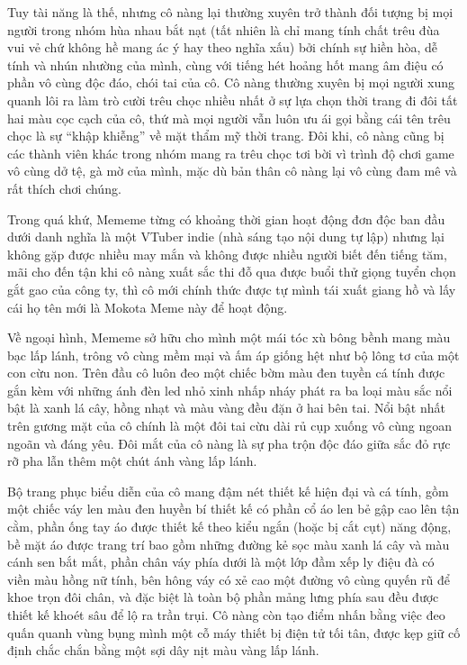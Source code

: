 \documentclass[../main.tex]{subfiles}
\begin{document}
Tuy tài năng là thế, nhưng cô nàng lại thường xuyên trở thành đối tượng bị mọi người trong nhóm hùa nhau bắt nạt (tất nhiên là chỉ mang tính chất trêu đùa vui vẻ chứ không hề mang ác ý hay theo nghĩa xấu) bởi chính sự hiền hòa, dễ tính và nhún nhường của mình, cùng với tiếng hét hoảng hốt mang âm điệu có phần vô cùng độc đáo, chói tai của cô. Cô nàng thường xuyên bị mọi người xung quanh lôi ra làm trò cười trêu chọc nhiều nhất ở sự lựa chọn thời trang đi đôi tất hai màu cọc cạch của cô, thứ mà mọi người vẫn luôn ưu ái gọi bằng cái tên trêu chọc là sự ``khập khiễng'' về mặt thẩm mỹ thời trang. Đôi khi, cô nàng cũng bị các thành viên khác trong nhóm mang ra trêu chọc tơi bời vì trình độ chơi game vô cùng dở tệ, gà mờ của mình, mặc dù bản thân cô nàng lại vô cùng đam mê và rất thích chơi chúng.

Trong quá khứ, Mememe từng có khoảng thời gian hoạt động đơn độc ban đầu dưới danh nghĩa là một VTuber indie (nhà sáng tạo nội dung tự lập) nhưng lại không gặp được nhiều may mắn và không được nhiều người biết đến tiếng tăm, mãi cho đến tận khi cô nàng xuất sắc thi đỗ qua được buổi thử giọng tuyển chọn gắt gao của công ty, thì cô mới chính thức được tự mình tái xuất giang hồ và lấy cái họ tên mới là Mokota Meme này để hoạt động.

Về ngoại hình, Mememe sở hữu cho mình một mái tóc xù bông bềnh mang màu bạc lấp lánh, trông vô cùng mềm mại và ấm áp giống hệt như bộ lông tơ của một con cừu non. Trên đầu cô luôn đeo một chiếc bờm màu đen tuyền cá tính được gắn kèm với những ánh đèn led nhỏ xinh nhấp nháy phát ra ba loại màu sắc nổi bật là xanh lá cây, hồng nhạt và màu vàng đều đặn ở hai bên tai. Nổi bật nhất trên gương mặt của cô chính là một đôi tai cừu dài rủ cụp xuống vô cùng ngoan ngoãn và đáng yêu. Đôi mắt của cô nàng là sự pha trộn độc đáo giữa sắc đỏ rực rỡ pha lẫn thêm một chút ánh vàng lấp lánh.

Bộ trang phục biểu diễn của cô mang đậm nét thiết kế hiện đại và cá tính, gồm một chiếc váy len màu đen huyền bí thiết kế có phần cổ áo len bẻ gập cao lên tận cằm, phần ống tay áo được thiết kế theo kiểu ngắn (hoặc bị cắt cụt) năng động, bề mặt áo được trang trí bao gồm những đường kẻ sọc màu xanh lá cây và màu cánh sen bắt mắt, phần chân váy phía dưới là một lớp đầm xếp ly điệu đà có viền màu hồng nữ tính, bên hông váy có xẻ cao một đường vô cùng quyến rũ để khoe trọn đôi chân, và đặc biệt là toàn bộ phần mảng lưng phía sau đều được thiết kế khoét sâu để lộ ra trần trụi. Cô nàng còn tạo điểm nhấn bằng việc đeo quấn quanh vùng bụng mình một cỗ máy thiết bị điện tử tối tân, được kẹp giữ cố định chắc chắn bằng một sợi dây nịt màu vàng lấp lánh.
\end{document}
